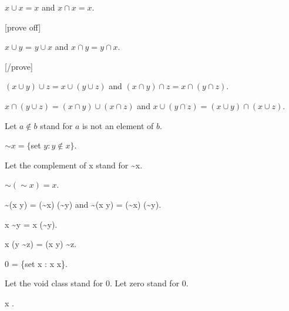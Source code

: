 \documentclass[a4paper,draft]{amsproc}
\begin{document}
\begin{forthel}
\begin{theorem}[5]
$x \cup x = x$ and $x \cap x = x$.
\end{theorem}

[prove off]
\begin{theorem}[6]
$x \cup y$ = $y \cup x$ and $x \cap y = y \cap x$.
\end{theorem}
[/prove]

\begin{theorem}[7]
$(x \cup y) \cup z = x \cup (y \cup z)$ 
and $(x \cap y) \cap z = x \cap (y \cap z)$.
\end{theorem}

\begin{theorem}[8]
$x \cap (y \cup z) = (x \cap y) \cup (x \cap z)$
and $x \cup (y \cap z) = (x \cup y) \cap (x \cup z)$.
\end{theorem}

Let $a \notin b$ stand for $a$ is not an element of $b$.

\begin{definition}[10] 
$\sim x = \{$set $y : y \notin x\}$.
\end{definition}
Let the complement of x stand for \sim x.

\begin{theorem}[11]
$\sim (\sim x) = x$.
\end{theorem}

\begin{theorem}[12]
\sim (x \cup y) = (\sim x) \cap (\sim y) 
and \sim (x \cap y) = (\sim x) \cup (\sim y).
\end{theorem}

\begin{definition}[13] x \sim y = x \cap (\sim y).\end{definition}

\begin{theorem}[14]
x \cap (y \sim z) = (x \cap y) \sim z.
\end{theorem}

\begin{definition}[15] 
0 = \{set x : x \neq x\}.
\end{definition}
Let the void class stand for 0.
Let zero stand for 0.

\begin{theorem}[16]
x .
\end{theorem}


\end{forthel}
\end{document}
